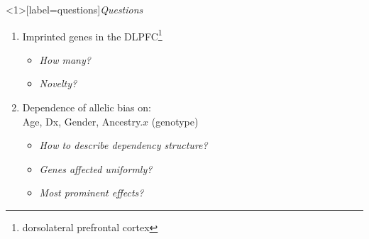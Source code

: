 \documentclass{beamer} %
\begin{document}
%
%
%
%
%

\begin{frame}<1>[label=questions]{\textit{Questions} }
\begin{enumerate}
\item Imprinted genes in the DLPFC\footnote{dorsolateral prefrontal
cortex}
\begin{itemize}
\item \textit{How many?} 
\item \textit{Novelty?} 
\end{itemize}
\item Dependence of allelic bias on:\\
Age, Dx, Gender, Ancestry.\(x\) (genotype)
\begin{itemize}
\item \textit{How to describe dependency structure?} 
\item \textit{Genes affected uniformly?} 
\item \textit{Most prominent effects?} 
\end{itemize}
\end{enumerate}
\end{frame}

\end{document}
